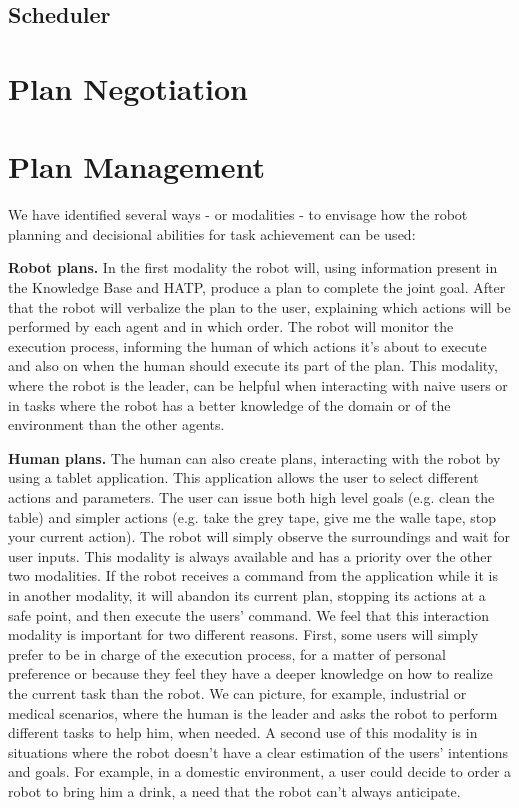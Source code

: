 \subsection{Scheduler}

\section{Plan Negotiation}

\section{Plan Management}
We have identified several ways - or
modalities - to envisage how the robot planning and decisional abilities
for task achievement can be used: 

\noindent
\textbf{Robot plans.}
In the first modality the robot will, using information present in the
Knowledge Base and HATP, produce a plan to complete the joint
goal. After that the robot will verbalize the plan to the user,
explaining which actions will be performed by each agent and in which
order. The robot will monitor the execution process, informing the
human of which actions it's about to execute and also on when the human
should execute its part of the plan. This modality, where the robot is
the leader, can be helpful when interacting with
naive users or in tasks where the robot has a better knowledge of the
domain or of the environment than the other agents.

\noindent
\textbf{Human plans.}
The human can also create plans, interacting with the robot by using a
tablet application. This application allows the user to select
different actions and parameters. The user can issue both high level goals (e.g. clean the
table) and simpler actions (e.g. take the grey tape, give me the walle
tape, stop your current action). The robot will simply observe the
surroundings and wait for user inputs. This modality is always available and has a priority over
the other two modalities. If the robot receives a command from the
application while it is in another modality, it will abandon its current
plan, stopping its actions at a safe point, and then execute the users'
command. We feel that this interaction modality is important for two
different reasons.  First, some users will simply prefer to be in
charge of the execution process, for a matter of personal preference or because they
feel they have a deeper knowledge on how to realize the current task
than the robot. We can picture, for example, industrial or medical
scenarios, where the human is the leader and asks the robot to perform
different tasks to help him, when needed. A second use of this modality is in situations where
the robot doesn't have  a clear estimation of the users' intentions and
goals. For example, in a domestic environment, a user could decide to
order a robot to bring him a drink, a need that the robot can't always anticipate.


